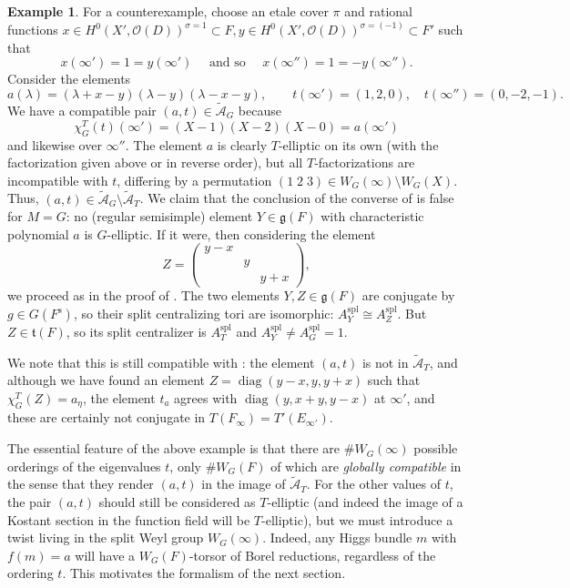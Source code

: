 \documentclass[openany]{amsbook}
\theoremstyle{definition}
\newtheorem{example}[theorem]{Example}
\theoremstyle{remark}
\numberwithin{equation}{section}
\renewcommand{\O}{\mathcal{O}}
\newcommand{\cA}{\mathcal{A}}
\renewcommand{\-}{\operatorname{-}}
\newcommand{\g}{\mathfrak{g}}
\newcommand{\on}[1]{\operatorname{#1}}
\newcommand{\ctA}{\widetilde{\cA}}
\newcommand{\ft}{\mathfrak{t}}
\renewcommand{\fg}{\mathfrak{g}}
\newcommand{\sep}{\text{s}}
\newcommand{\spl}{\mathrm{spl}}
\begin{document}
\begin{example}
    For a counterexample, choose an etale cover $\pi$ and rational functions $x \in H^0(X', \O(D))^{\sigma = 1} \subset F, y \in H^0(X', \O(D))^{\sigma = (-1)} \subset F'$ such that 
    \[
        x(\infty') = 1 = y(\infty') \quad \text{ and so } \quad x(\infty'') = 1 = - y(\infty'').
    \]
    Consider the elements
    \[
        a(\lambda) = (\lambda + x - y)(\lambda - y)(\lambda - x - y), \qquad t(\infty') = (1,2,0), \quad t(\infty'') = (0, -2,-1).
    \]
    We have a compatible pair $(a,t) \in \ctA_G$ because 
    \[
        \chi^T_G(t)(\infty') = (X - 1)(X - 2)(X - 0) = a(\infty')
    \]
    and likewise over $\infty''$. The element $a$ is clearly $T$-elliptic on its own (with the factorization given above or in reverse order), but all $T$-factorizations are incompatible with $t$, differing by a permutation $(1 \; 2 \; 3) \in W_G(\infty) \setminus W_G(X)$. Thus, $(a,t) \in \ctA_{G} \setminus \ctA_T$. We claim that the conclusion of the converse of \cite[Corollaire 3.9.2]{CLI} is false for $M = G$: no (regular semisimple) element $Y \in \fg(F)$ with characteristic polynomial $a$ is $G$-elliptic. If it were, then considering the element
    \[
        Z = \begin{pmatrix}
            y - x & & \\
            & y & \\
            &  & y + x
        \end{pmatrix},
    \]
    we proceed as in the proof of \cite[Corollaire 3.9.2]{CLI}. The two elements $Y,Z \in \g(F)$ are conjugate by $g \in G(F^{\sep})$, so their split centralizing tori are isomorphic: $A_Y^{\spl} \cong A_Z^{\spl}$. But $Z \in \ft(F)$, so its split centralizer is $A_T^{\spl}$ and $A_Y^{\spl} \neq A_G^{\spl} = 1$.  
    
    We note that this is still compatible with \cite[Proposition 3.9.1]{CLI}: the element $(a,t)$ is not in $\ctA_T$, and although we have found an element $Z = \on{diag}(y-x, y, y+x)$ such that $\chi^T_G(Z) = a_\eta$, the element $t_a$ agrees with $\on{diag}(y, x+y, y-x)$ at $\infty'$, and these are certainly not conjugate in $T(F_{\infty}) = T'(E_{\infty'})$. 
\end{example}

The essential feature of the above example is that there are $\# W_G(\infty)$ possible orderings of the eigenvalues $t$, only $\# W_G(F)$ of which are \textit{globally compatible} in the sense that they render $(a,t)$ in the image of $\ctA_T$. For the other values of $t$, the pair $(a,t)$ should still be considered as $T$-elliptic (and indeed the image of a Kostant section in the function field will be $T$-elliptic), but we must introduce a twist living in the split Weyl group $W_G(\infty)$. Indeed, any Higgs bundle $m$ with $f(m) = a$ will have a $W_G(F)$-torsor of Borel reductions, regardless of the ordering $t$. This motivates the formalism of the next section.
\end{document}
